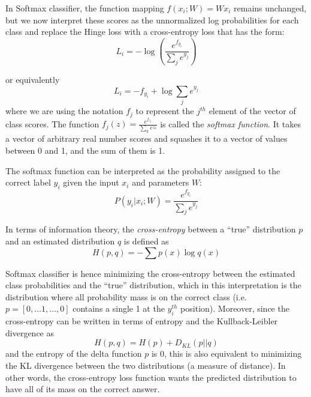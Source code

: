 \documentclass[10pt,twocolumn,letterpaper]{article}
\begin{document}
	In Softmax classifier, the function mapping $f(x_i; W)=W x_i$ remains unchanged, but we now interpret these scores as the unnormalized log probabilities for each class and replace the Hinge loss with a cross-entropy loss that has the form:
\begin{equation}
	L_i = -\log \left( \frac{e^{f_{y_i}}}{\sum_{j} e^{y_j}}\right)
\end{equation}

	or equivalently
\begin{equation}
	L_i = -f_{y_i} + \log \sum_j e^{y_j}
\end{equation}
	where we are using the notation $f_j$ to represent the $j^{th}$ element of the vector of class scores. The function $f_j(z) = \frac{e^{f_{z_j}}}{\sum_{k} e^{z_k}}$ is called the \emph{softmax function}. It takes a vector of arbitrary real number scores and squashes it to a vector of values between 0 and 1, and the sum of them is 1. 

	The softmax function can be interpreted as the probability assigned to the correct label $y_i$ given the input $x_i$ and parameters $W$:
\begin{equation}
	P(y_i | x_i; W) = \frac{e^{f_{y_i}}}{\sum_{j} e^{y_j}}
\end{equation}

	In terms of information theory, the \emph{cross-entropy} between a ``true'' distribution $p$ and an estimated distribution $q$ is defined as
\begin{equation}
	H(p, q) = -\sum p(x) \log q(x)
\end{equation}

	Softmax classifier is hence minimizing the cross-entropy between the estimated class probabilities and the ``true'' distribution, which in this interpretation is the distribution where all probability mass is on the correct class (i.e. $p=[0,\dots 1,\dots, 0]$ contains a single 1 at the $y_i^{th}$ position). Moreover, since the cross-entropy can be written in terms of entropy and the Kullback-Leibler divergence \cite{KLdivergence} as 
\begin{equation}
	H(p, q) = H(p) + D_{KL}(p||q)
\end{equation}
	and the entropy of the delta function $p$ is 0, this is also equivalent to minimizing the KL divergence between the two distributions (a measure of distance). In other words, the cross-entropy loss function wants the predicted distribution to have all of its mass on the correct answer.
\end{document}
